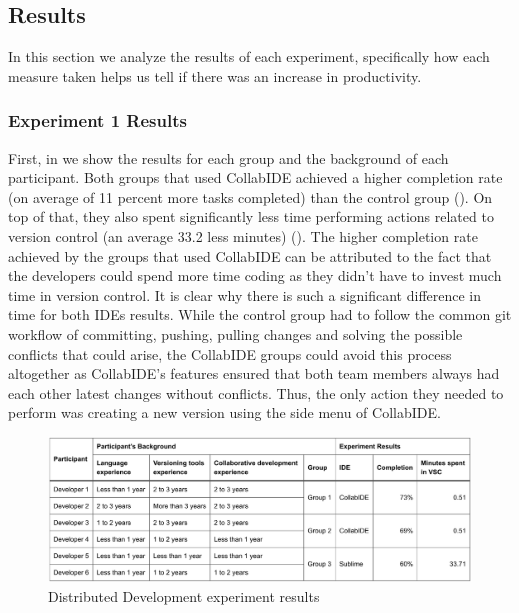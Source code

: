 	

\subsection{Results}

In this section we analyze the results of each experiment, specifically how each measure taken helps us tell if there was an increase in productivity.

\subsubsection{Experiment 1 Results}

First, in  we show the results for each group and the background of each participant. Both groups that used CollabIDE achieved a higher completion rate (on average of 11 percent more tasks completed) than the control group (). On top of that, they also spent significantly less time performing actions related to version control (an average 33.2 less minutes) (). The higher completion rate achieved by the groups that used CollabIDE can be attributed to the fact that the developers could spend more time coding as they didn’t have to invest much time in version control. It is clear why there is such a significant difference in time for both IDEs results. While the control group had to follow the common git workflow of committing, pushing, pulling changes and solving the possible conflicts that could arise, the CollabIDE groups could avoid this process altogether as CollabIDE’s features ensured that both team members always had each other latest changes without conflicts. Thus, the only action they needed to perform was creating a new version using the side menu of CollabIDE.

\begin{figure}[htbp]
  \centering
  \includegraphics[width=1\textwidth]{img/resultsTableCollaborative}
  \caption{Distributed Development experiment results}
  \label{fig:resultsTableCollaborative}
\end{figure}

